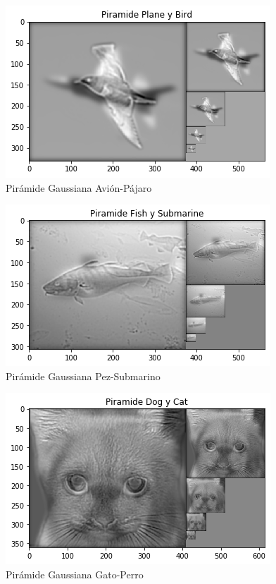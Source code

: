 \documentclass[12pt,spanish]{article}
\begin{document}
\begin{figure}[H]
	\centering
	\includegraphics[scale=1.1]{./imagenes_memoria/b1cb}
	\caption{Pirámide Gaussiana Avión-Pájaro}
	\label{bonus1cb}
\end{figure}

\begin{figure}[H]
	\centering
	\includegraphics[scale=1.1]{./imagenes_memoria/b1cc}
	\caption{Pirámide Gaussiana Pez-Submarino}
	\label{bonus1cc}
\end{figure}

\begin{figure}[H]
	\centering
	\includegraphics[scale=1.1]{./imagenes_memoria/b1cd}
	\caption{Pirámide Gaussiana Gato-Perro}
	\label{bonus1cd}
\end{figure}
\end{document}
